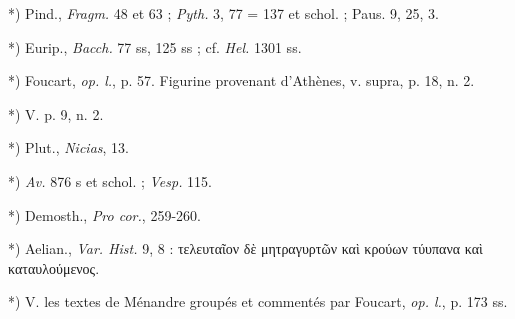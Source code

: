 \documentclass[a4paper, 11pt, oneside, polutonikogreek, french]{article}
\begin{document}
*) Pind., \emph{Fragm.} 48 et 63 ; \emph{Pyth.} 3, 77 = 137 et schol. ; Paus. 9, 25, 3.

*) Eurip., \emph{Bacch.} 77 ss, 125 ss ; cf. \emph{Hel.} 1301 ss.

*) Foucart, \emph{op. l.}, p. 57. Figurine provenant d'Athènes, v. supra, p. 18, n. 2.

*) V. p. 9, n. 2.

*) Plut., \emph{Nicias}, 13.

*) \emph{Av.} 876 s et schol. ; \emph{Vesp.} 115.

*) Demosth., \emph{Pro cor.}, 259-260.

*) Aelian., \emph{Var. Hist.} 9, 8 : τελευταῖον δὲ μητραγυρτῶν καὶ κρούων τύυπανα καὶ καταυλούμενος.

*) V. les textes de Ménandre groupés et commentés par Foucart, \emph{op. l.}, p. 173 ss.
\end{document}
